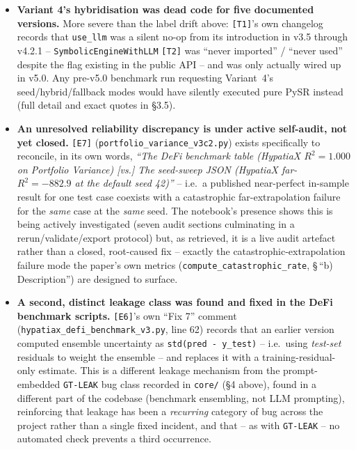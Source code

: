 \documentclass[11pt,a4paper]{article}
\newcommand{\code}[1]{\texttt{\small #1}}
\begin{document}
\begin{itemize}
        produced by \code{[E2]} do not self-report which of at least three
        engine revisions (v5.2/v5.3/v5.4) actually produced them.
  \item \textbf{Variant 4's hybridisation was dead code for five documented
        versions.} More severe than the label drift above: \code{[T1]}'s
        own changelog records that \code{use\_llm} was a silent no-op from
        its introduction in v3.5 through v4.2.1 -- \code{SymbolicEngineWithLLM}
        \code{[T2]} was ``never imported'' / ``never used'' despite the flag
        existing in the public API -- and was only actually wired up in
        v5.0. Any pre-v5.0 benchmark run requesting Variant~4's
        seed/hybrid/fallback modes would have silently executed pure PySR
        instead (full detail and exact quotes in \S3.5).
  \item \textbf{An unresolved reliability discrepancy is under active
        self-audit, not yet closed.} \code{[E7]} (\code{portfolio\_variance\_v3c2.py})
        exists specifically to reconcile, in its own words, \emph{``The
        DeFi benchmark table (HypatiaX $R^2=1.000$ on Portfolio Variance)
        [vs.] The seed-sweep JSON (HypatiaX far-$R^2=-882.9$ at the
        default seed 42)''} -- i.e.\ a published near-perfect in-sample
        result for one test case coexists with a catastrophic
        far-extrapolation failure for the \emph{same} case at the
        \emph{same} seed. The notebook's presence shows this is being
        actively investigated (seven audit sections culminating in a
        rerun/validate/export protocol) but, as retrieved, it is a live
        audit artefact rather than a closed, root-caused fix -- exactly the
        catastrophic-extrapolation failure mode the paper's own metrics
        (\code{compute\_catastrophic\_rate}, \S\,``b) Description'') are
        designed to surface.
  \item \textbf{A second, distinct leakage class was found and fixed in the
        DeFi benchmark scripts.} \code{[E6]}'s own ``Fix 7'' comment
        (\code{hypatiax\_defi\_benchmark\_v3.py}, line 62) records that an
        earlier version computed ensemble uncertainty as
        \code{std(pred - y\_test)} -- i.e.\ using \emph{test-set} residuals
        to weight the ensemble -- and replaces it with a
        training-residual-only estimate. This is a different leakage
        mechanism from the prompt-embedded \code{GT-LEAK} bug class
        recorded in \code{core/} (\S4 above), found in a different part of
        the codebase (benchmark ensembling, not LLM prompting), reinforcing
        that leakage has been a \emph{recurring} category of bug across
        the project rather than a single fixed incident, and that -- as
        with \code{GT-LEAK} -- no automated check prevents a third
        occurrence.
\end{itemize}
\end{document}
